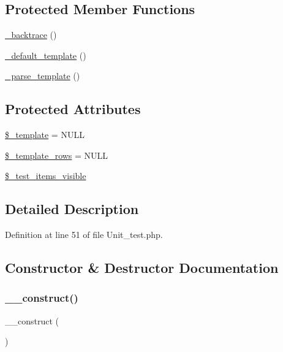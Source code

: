 \subsection*{Protected Member Functions}
\begin{DoxyCompactItemize}
\item 
\mbox{\hyperlink{class_c_i___unit__test_aae40ff64c7daf1d70efaf110181a257e}{\+\_\+backtrace}} ()
\item 
\mbox{\hyperlink{class_c_i___unit__test_ae1990fcb9ffc455614eeac9a1091f0b0}{\+\_\+default\+\_\+template}} ()
\item 
\mbox{\hyperlink{class_c_i___unit__test_a884e99b431f75c1ad17ba9753dab3b49}{\+\_\+parse\+\_\+template}} ()
\end{DoxyCompactItemize}
\subsection*{Protected Attributes}
\begin{DoxyCompactItemize}
\item 
\mbox{\hyperlink{class_c_i___unit__test_a353afce17912a98c6a9ead92e679570d}{\$\+\_\+template}} = N\+U\+LL
\item 
\mbox{\hyperlink{class_c_i___unit__test_a5d3e2ba4262eb08f117b1e6842f1f162}{\$\+\_\+template\+\_\+rows}} = N\+U\+LL
\item 
\mbox{\hyperlink{class_c_i___unit__test_aa8b5dd7058c9c945ed964e96777d72c4}{\$\+\_\+test\+\_\+items\+\_\+visible}}
\end{DoxyCompactItemize}


\subsection{Detailed Description}


Definition at line 51 of file Unit\+\_\+test.\+php.



\subsection{Constructor \& Destructor Documentation}
\mbox{\label{class_c_i___unit__test_a095c5d389db211932136b53f25f39685}} 
\subsubsection{\texorpdfstring{\_\_construct()}{\_\_construct()}}
{\footnotesize\ttfamily \+\_\+\+\_\+construct (\begin{DoxyParamCaption}{ }\end{DoxyParamCaption})}

